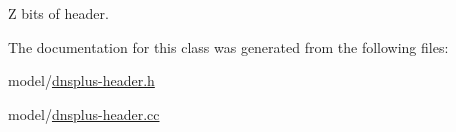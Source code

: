 Z bits of header. 



The documentation for this class was generated from the following files\-:\begin{DoxyCompactItemize}
\item 
model/\hyperlink{dnsplus-header_8h}{dnsplus-\/header.\-h}\item 
model/\hyperlink{dnsplus-header_8cc}{dnsplus-\/header.\-cc}\end{DoxyCompactItemize}

